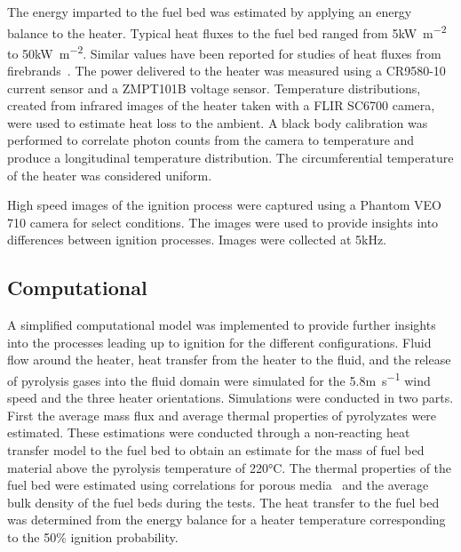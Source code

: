     The energy imparted to the fuel bed was estimated by applying an energy balance to the heater. Typical heat fluxes to the fuel bed ranged from 5\si{\kilo\watt\per\square\meter} to 50\si{\kilo\watt\per\square\meter}. Similar values have been reported for studies of heat fluxes from firebrands~\cite{Hakes2019a, Tao2020}. The power delivered to the heater was measured using a CR9580-10 current sensor and a ZMPT101B voltage sensor. Temperature distributions, created from infrared images of the heater taken with a FLIR SC6700 camera, were used to estimate heat loss to the ambient. A black body calibration was performed to correlate photon counts from the camera to temperature and produce a longitudinal temperature distribution. The circumferential temperature of the heater was considered uniform.
    
    High speed images of the ignition process were captured using a Phantom VEO 710 camera for select conditions. The images were used to provide insights into differences between ignition processes. Images were collected at 5\si{\kilo\hertz}. 
    
    \subsection{Computational}
    
    A simplified computational model was implemented to provide further insights into the processes leading up to ignition for the different configurations. Fluid flow around the heater, heat transfer from the heater to the fluid, and the release of pyrolysis gases into the fluid domain were simulated for the 5.8\si{\meter\per\second} wind speed and the three heater orientations. Simulations were conducted in two parts. First the average mass flux and average thermal properties of pyrolyzates were estimated. These estimations were conducted through a non-reacting heat transfer model to the fuel bed to obtain an estimate for the mass of fuel bed material above the pyrolysis temperature of 220\si{\celsius}. The thermal properties of the fuel bed were estimated using correlations for porous media~\cite{bergman2011fundamentals} and the average bulk density of the fuel beds during the tests. The heat transfer to the fuel bed was determined from the energy balance for a heater temperature corresponding to the 50\% ignition probability. 
    
